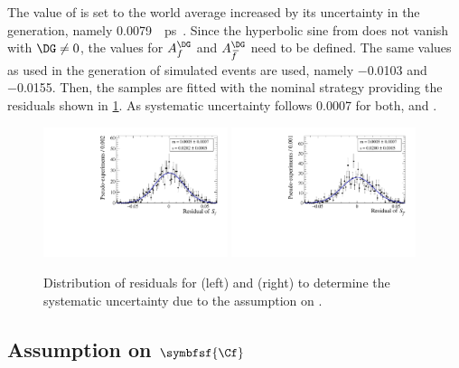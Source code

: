 The value of \DG is set to the world average increased by its uncertainty in the generation, namely \SI{0.0079}{\per\pico\second}~\cite{HFLAV2016}.
Since the hyperbolic sine from  does not vanish with $\DG\neq0$, the values for $A_f^{\DG}$ and $A_{\kern 1.5pt\overline{\kern -1.5pt f\kern 1.5pt}}^{\DG}$ need to be defined.
The same values as used in the generation of simulated events are used, namely \num{-0.0103} and \num{-0.0155}.
Then, the samples are fitted with the nominal strategy providing the residuals shown in \cref{fig:systUncertDG}.
As systematic uncertainty follows \num{0.0007} for both, \Sf and \Sfbar.
\begin{figure}[tbp]
    \centering
    \includegraphics[width=0.48\textwidth]{10Systematics/figs/DG_Sf_res.pdf}
    \includegraphics[width=0.48\textwidth]{10Systematics/figs/DG_Sfbar_res.pdf}
    \caption{Distribution of residuals for \Sf (left) and \Sfbar (right) to determine the systematic uncertainty due to the assumption on \DG.}
    \label{fig:systUncertDG}
\end{figure}

\subsection*{Assumption on $\symbfsf{\Cf}$}


